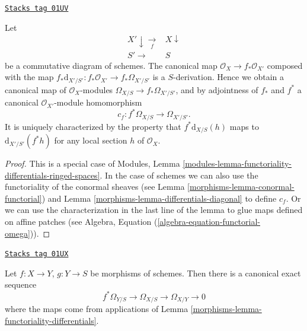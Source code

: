 \begin{lemma}
\label{morphisms-lemma-functoriality-differentials}
\href{https://stacks.math.columbia.edu/tag/01UV}{\texttt{Stacks tag 01UV}}

Let
$$
\begin{array}{cc}X' \downarrow\underset{f}{\longrightarrow} & X \downarrow \\ S' \longrightarrow & S\end{array}
$$
be a commutative diagram of schemes. The canonical map
$\mathcal{O}_X \to f_*\mathcal{O}_{X'}$ composed with the map
$f_*\text{d}_{X'/S'} : f_*\mathcal{O}_{X'} \to f_*\Omega_{X'/S'}$ is a
$S$-derivation. Hence we obtain a canonical map of $\mathcal{O}_X$-modules
$\Omega_{X/S} \to f_*\Omega_{X'/S'}$, and by
adjointness of $f_*$ and $f^*$ a
canonical $\mathcal{O}_{X'}$-module homomorphism
$$
c_f : f^*\Omega_{X/S} \longrightarrow \Omega_{X'/S'}.
$$
It is uniquely characterized by the property that
$f^*\text{d}_{X/S}(h)$ maps to $\text{d}_{X'/S'}(f^* h)$
for any local section $h$ of $\mathcal{O}_X$.
\end{lemma}

\begin{proof}

This is a special case of
Modules, Lemma \ref{modules-lemma-functoriality-differentials-ringed-spaces}.
In the case of schemes we can also use the functoriality of
the conormal sheaves (see Lemma \ref{morphisms-lemma-conormal-functorial}) and
Lemma \ref{morphisms-lemma-differentials-diagonal} to define $c_f$.
Or we can use the characterization in the last line of the lemma to
glue maps defined on affine patches
(see Algebra, Equation (\ref{algebra-equation-functorial-omega})).
\end{proof}

\begin{lemma}
\label{morphisms-lemma-triangle-differentials}
\href{https://stacks.math.columbia.edu/tag/01UX}{\texttt{Stacks tag 01UX}}

Let $f : X \to Y$, $g : Y \to S$ be morphisms of schemes.
Then there is a canonical exact sequence
$$
f^*\Omega_{Y/S} \to \Omega_{X/S} \to \Omega_{X/Y} \to 0
$$
where the maps come from applications of
Lemma \ref{morphisms-lemma-functoriality-differentials}.
\end{lemma}

